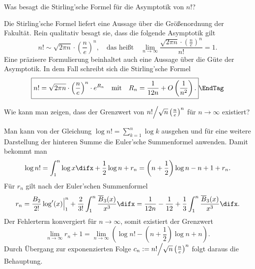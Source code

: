   \begin{frage}
    Was besagt die Stirling'sche Formel für die Asymptotik von $n!$?
  \end{frage}

  \begin{antwort}
    Die Stirling'sche Formel liefert eine Aussage über die 
    Größenordnung der Fakultät. Rein qualitativ besagt sie, dass 
    die folgende Asymptotik gilt
    \[
    \boxed{
      n! \sim 
      \sqrt{2\pi n} \cdot \left( \frac{n}{e} \right)^n, 
      \quad\text{das heißt}\quad 
      \lim_{n\to\infty} \frac{ 
        \sqrt{2\pi n} \cdot \left( \frac{n}{e} \right)^n}{n!} = 1.
    }
    \]
    Eine präzisere Formulierung beinhaltet auch eine Aussage über die 
    Güte der Asymptotik. 
    In dem Fall schreibt sich die Stirling'sche Formel 
    \begin{equation}
      \boxed{
        n! =\sqrt{2\pi n} \cdot \left( \frac{n}{e} \right)^n 
        \cdot e^{R_n}\quad\text{mit}\quad 
        R_n = \frac{1}{12n} + O\left( \frac{1}{n^2} \right ). 
      }
      \EndTag
    \end{equation}
  \end{antwort}

  \begin{frage}
    Wie kann man zeigen, dass der Grenzwert von  
    $n!\Big{/} \sqrt{n} \left( \frac{n}{e} \right)^n$ 
    für $n\to\infty$ existiert? 
  \end{frage}

  \begin{antwort}
    Man kann von der Gleichung  $\log n! = \sum_{k=1}^n \log k$ 
    ausgehen und für eine weitere Darstellung der hinteren Summe 
    die Euler'sche Summenformel anwenden. Damit bekommt man
    \[
    \log n! = \int_1^{n} \log x \difx  + \frac{1}{2} \log n  + r_n
    = \left(n+\frac{1}{2} \right) \log n - n +1 + r_n.   
    \]
    Für $r_n$ gilt nach der Euler'schen Summenformel
    \[
    r_n =  \frac{B_2}{2!} \log'(x) \Big|_1^n + 
    \frac{2}{3!} \int_1^{n} \frac{\overline{B}_3(x)}{x^3} \difx = 
    \frac{1}{12n} -\frac{1}{12} + \frac{1}{3} 
    \int_1^{n} \frac{\overline{B}_3(x)}{x^3} \difx. 
    \]
    Der Fehlerterm konvergiert für $n\to \infty$, somit existiert der 
    Grenzwert  
    \[
    \lim_{n\to\infty} r_n + 1 =  
    \lim_{n\to\infty} \left( 
      \log n! - \left( n+\frac{1}{2} \right) \log n + n \right). 
    \]
    Durch Übergang zur exponenzierten Folge 
    $c_n := n! \Big{/} \sqrt{n}\left( \frac{n}{e} \right)^n$ 
    folgt daraus die Behauptung.
    \AntEnd
  \end{antwort}

